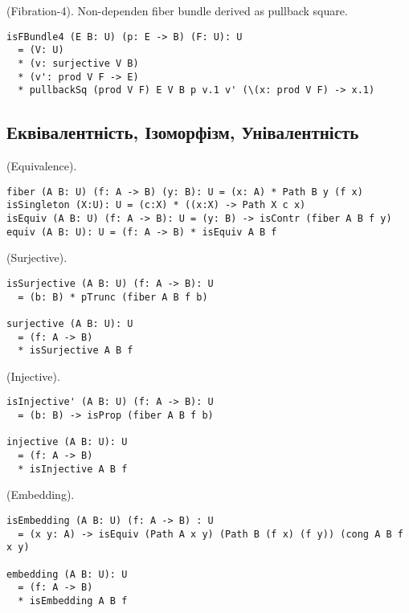 \begin{definition} (Fibration-4). Non-dependen fiber bundle derived as pullback square.
\begin{lstlisting}
isFBundle4 (E B: U) (p: E -> B) (F: U): U
  = (V: U)
  * (v: surjective V B)
  * (v': prod V F -> E)
  * pullbackSq (prod V F) E V B p v.1 v' (\(x: prod V F) -> x.1)
\end{lstlisting}
\end{definition}

\subsection{Еквівалентність, Ізоморфізм, Унівалентність}

\begin{definition} (Equivalence).
\begin{lstlisting}
fiber (A B: U) (f: A -> B) (y: B): U = (x: A) * Path B y (f x)
isSingleton (X:U): U = (c:X) * ((x:X) -> Path X c x)
isEquiv (A B: U) (f: A -> B): U = (y: B) -> isContr (fiber A B f y)
equiv (A B: U): U = (f: A -> B) * isEquiv A B f
\end{lstlisting}
\end{definition}

\begin{definition} (Surjective).
\begin{lstlisting}
isSurjective (A B: U) (f: A -> B): U
  = (b: B) * pTrunc (fiber A B f b)

surjective (A B: U): U
  = (f: A -> B)
  * isSurjective A B f
\end{lstlisting}
\end{definition}

\begin{definition} (Injective).
\begin{lstlisting}
isInjective' (A B: U) (f: A -> B): U
  = (b: B) -> isProp (fiber A B f b)

injective (A B: U): U
  = (f: A -> B)
  * isInjective A B f
\end{lstlisting}
\end{definition}

\begin{definition} (Embedding).
\begin{lstlisting}
isEmbedding (A B: U) (f: A -> B) : U
  = (x y: A) -> isEquiv (Path A x y) (Path B (f x) (f y)) (cong A B f x y)

embedding (A B: U): U
  = (f: A -> B)
  * isEmbedding A B f
\end{lstlisting}
\end{definition}

